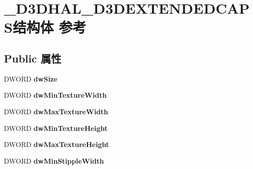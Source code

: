 \hypertarget{struct___d3_d_h_a_l___d3_d_e_x_t_e_n_d_e_d_c_a_p_s}{}\section{\+\_\+\+D3\+D\+H\+A\+L\+\_\+\+D3\+D\+E\+X\+T\+E\+N\+D\+E\+D\+C\+A\+P\+S结构体 参考}
\label{struct___d3_d_h_a_l___d3_d_e_x_t_e_n_d_e_d_c_a_p_s}
\subsection*{Public 属性}
\begin{DoxyCompactItemize}
\item 
\mbox{\label{struct___d3_d_h_a_l___d3_d_e_x_t_e_n_d_e_d_c_a_p_s_a2531f03acad8fd1dc66e7954e3b09eec}} 
D\+W\+O\+RD {\bfseries dw\+Size}
\item 
\mbox{\label{struct___d3_d_h_a_l___d3_d_e_x_t_e_n_d_e_d_c_a_p_s_aa676c0507e90866a70cbc67b0deca040}} 
D\+W\+O\+RD {\bfseries dw\+Min\+Texture\+Width}
\item 
\mbox{\label{struct___d3_d_h_a_l___d3_d_e_x_t_e_n_d_e_d_c_a_p_s_a360b4ec40795055b6c633765a8840d39}} 
D\+W\+O\+RD {\bfseries dw\+Max\+Texture\+Width}
\item 
\mbox{\label{struct___d3_d_h_a_l___d3_d_e_x_t_e_n_d_e_d_c_a_p_s_a09284f43af58fcce792a88a115d9ccfb}} 
D\+W\+O\+RD {\bfseries dw\+Min\+Texture\+Height}
\item 
\mbox{\label{struct___d3_d_h_a_l___d3_d_e_x_t_e_n_d_e_d_c_a_p_s_a8e6258a2e3de696c69e6fd39f7ff464b}} 
D\+W\+O\+RD {\bfseries dw\+Max\+Texture\+Height}
\item 
\mbox{\label{struct___d3_d_h_a_l___d3_d_e_x_t_e_n_d_e_d_c_a_p_s_ae194065be318f4b5f07c3e7743da43fb}} 
D\+W\+O\+RD {\bfseries dw\+Min\+Stipple\+Width}
\item 
\mbox{\label{struct___d3_d_h_a_l___d3_d_e_x_t_e_n_d_e_d_c_a_p_s_ae7cb3d9eafbddc64177cc97b12d4efcf}} 

\end{DoxyCompactItemize}
